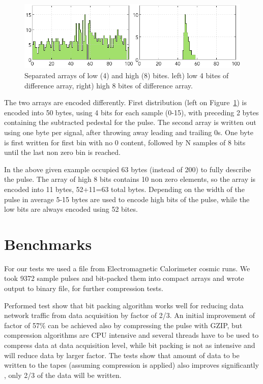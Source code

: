 \documentclass[12pt]{article}
\begin{document}
\begin{figure}[!ht]
\begin{center}

 \includegraphics[width=6in]{pics/fadc_pulse_bits.png}

 \caption {Separated arrays of low (4) and high (8) bites. left) low 4 bites of difference array,
 right) high 8 bites of difference array. }
 \label{FADC_PULSE_BITS}
 \end{center}
\end{figure}

The two arrays are encoded differently. First distribution (left on Figure~\ref{FADC_PULSE_BITS}) is encoded into 50 bytes, using 4 bits for each sample (0-15), with preceding 2 bytes containing the subtracted pedestal for the pulse. The second array is written out using one byte per signal, after
throwing away leading and trailing 0s. One byte is first written for first bin with no 0 content, followed
by N samples of 8 bits until the last non zero bin is reached.

In the above given example occupied 63 bytes (instead of 200) to fully describe the pulse.
The array of high 8 bits contains 10 non zero elements, so the array is encoded into 11 bytes,
52+11=63 total bytes. Depending on the width of the pulse in average 5-15 bytes are used to encode high bits of the pulse, while the low bits are always encoded using 52 bites.

\section{Benchmarks}

For our tests we used a file from Electromagnetic Calorimeter cosmic runs. We took 9372 sample
pulses and bit-packed them into compact arrays and wrote output to binary file, for further 
compression tests.

Performed test show that bit packing algorithm works well for reducing data network traffic 
from data acquisition by factor of 2/3. An initial improvement of factor of 57\% can be achieved 
also by compressing the pulse with GZIP, but compression algorithms are CPU intensive and several
threads have to be used to compress data at data acquisition level, while bit packing is not as intensive
and will reduce data by larger factor. The tests show that amount of data to be written to the tapes 
(assuming compression is applied) also improves significantly , only 2/3 of the data will be written.
\end{document}
